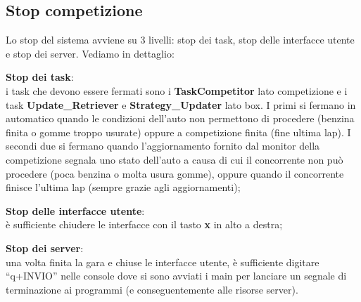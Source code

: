 \subsection{Stop competizione}
Lo stop del sistema avviene su 3 livelli: stop dei task, stop delle interfacce utente e stop dei server. Vediamo in dettaglio:
\begin{description}
\item{\textbf{Stop dei task}}:\\
i task che devono essere fermati sono i \textbf{TaskCompetitor} lato competizione e i task \textbf{Update\_Retriever} e \textbf{Strategy\_Updater} lato box.
I primi si fermano in automatico quando le condizioni dell'auto non permettono di procedere (benzina finita o gomme troppo usurate) oppure a competizione finita
(fine ultima lap). I secondi due si fermano quando l'aggiornamento fornito dal monitor della competizione segnala uno stato dell'auto a causa di cui il 
concorrente non pu\`{o} procedere (poca benzina o molta usura gomme), oppure quando il concorrente finisce l'ultima lap (sempre grazie agli aggiornamenti);
\item{\textbf{Stop delle interfacce utente}}:\\
\`{e} sufficiente chiudere le interfacce con il tasto \textbf{x} in alto a destra;
\item{\textbf{Stop dei server}}:\\
una volta finita la gara e chiuse le interfacce utente, \`{e} sufficiente digitare ``q+INVIO'' nelle console dove si sono avviati i main per lanciare un
segnale di terminazione ai programmi (e conseguentemente alle risorse server).
\end{description}
